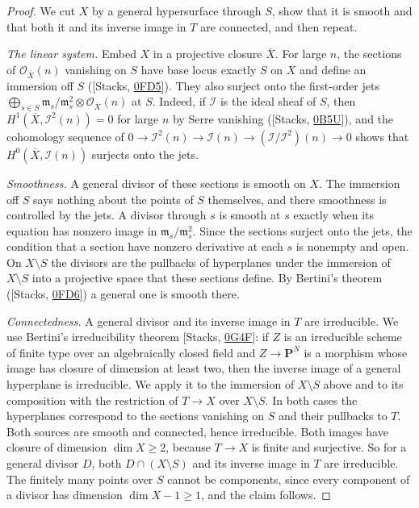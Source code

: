 \documentclass[11pt]{article}
\begin{document}
\begin{proof}[{Proof}]\label{bp282}%
We cut \(X\) by a general hypersurface through \(S\), show that it is smooth and that both it and its inverse image in \(T\) are connected, and then repeat.

\emph{The linear system.} Embed \(X\) in a projective closure \(\overline X\). For large \(n\), the sections of \(\mathcal O_{\overline X}(n)\) vanishing on \(S\) have base locus exactly \(S\) on \(X\) and define an immersion off \(S\) ([Stacks, \href{https://stacks.math.columbia.edu/tag/0FD5}{0FD5}]). They also surject onto the first-order jets \(\bigoplus_{s\in S}\mathfrak m_s/\mathfrak m_s^2\otimes
\mathcal O_{\overline X}(n)\) at \(S\). Indeed, if \(\mathcal I\) is the ideal sheaf of \(S\), then \(H^1(\overline X,\mathcal I^2(n))=0\) for large \(n\) by Serre vanishing ([Stacks, \href{https://stacks.math.columbia.edu/tag/0B5U}{0B5U}]), and the cohomology sequence of \(0\to\mathcal I^2(n)\to\mathcal I(n)\to(\mathcal I/\mathcal I^2)(n)\to0\) shows that \(H^0(\overline X,\mathcal I(n))\) surjects onto the jets.

\emph{Smoothness.} A general divisor of these sections is smooth on \(X\). The immersion off \(S\) says nothing about the points of \(S\) themselves, and there smoothness is controlled by the jets. A divisor through \(s\) is smooth at \(s\) exactly when its equation has nonzero image in \(\mathfrak m_s/\mathfrak m_s^2\). Since the sections surject onto the jets, the condition that a section have nonzero derivative at each \(s\) is nonempty and open. On \(X\setminus S\) the divisors are the pullbacks of hyperplanes under the immersion of \(X\setminus S\) into a projective space that these sections define. By Bertini's theorem ([Stacks, \href{https://stacks.math.columbia.edu/tag/0FD6}{0FD6}]) a general one is smooth there.

\emph{Connectedness.} A general divisor and its inverse image in \(T\) are irreducible. We use Bertini's irreducibility theorem [Stacks, \href{https://stacks.math.columbia.edu/tag/0G4F}{0G4F}]: if \(Z\) is an irreducible scheme of finite type over an algebraically closed field and \(Z\to\mathbf P^N\) is a morphism whose image has closure of dimension at least two, then the inverse image of a general hyperplane is irreducible. We apply it to the immersion of \(X\setminus S\) above and to its composition with the restriction of \(T\to X\) over \(X\setminus S\). In both cases the hyperplanes correspond to the sections vanishing on \(S\) and their pullbacks to \(T\). Both sources are smooth and connected, hence irreducible. Both images have closure of dimension \(\dim X\ge2\), because \(T\to X\) is finite and surjective. So for a general divisor \(D\), both \(D\cap(X\setminus S)\) and its inverse image in \(T\) are irreducible. The finitely many points over \(S\) cannot be components, since every component of a divisor has dimension \(\dim X-1\ge1\), and the claim follows.


\end{proof}
\end{document}
